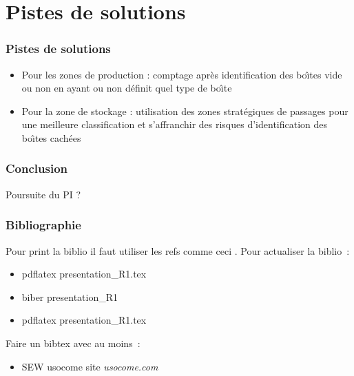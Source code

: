\documentclass[aspectratio = 43]{beamer}
\begin{document}
\section{Pistes de solutions}
\begin{frame}
  \frametitle{Pistes de solutions}
  \begin{itemize}
  \item Pour les zones de production : comptage apr{\`e}s identification
    des bo{\^\i}tes vide ou non en ayant ou non d{\'e}finit quel type de bo{\^\i}te
  \item Pour la zone de stockage : utilisation des zones strat{\'e}giques
    de passages pour une meilleure classification et s'affranchir des
    risques d'identification des bo{\^\i}tes cach{\'e}es
  \end{itemize}
\end{frame}
%
\begin{frame}
  \frametitle{Conclusion}
  Poursuite du PI ?
\end{frame}
\begin{frame}
  \frametitle{Bibliographie}
  Pour print la biblio il faut utiliser les refs comme ceci
  \citeauthor{bib:ziou}. Pour actualiser la biblio~:
  \begin{itemize}
  \item pdflatex presentation\_R1.tex
  \item biber presentation\_R1
  \item pdflatex presentation\_R1.tex
  \end{itemize}

  \printbibliography
  Faire un bibtex avec au moins~:
  \begin{itemize}
  \item SEW usocome site \textit{usocome.com}
  \end{itemize}
\end{frame}
\end{document}
